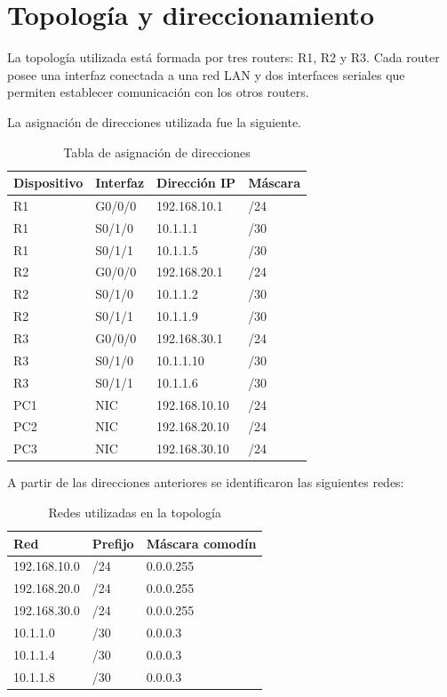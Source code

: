\documentclass[12pt,a4paper]{article}
\begin{document}
\section{Topología y direccionamiento}

La topología utilizada está formada por tres routers: R1, R2 y R3.
Cada router posee una interfaz conectada a una red LAN y dos
interfaces seriales que permiten establecer comunicación con los otros
routers.

La asignación de direcciones utilizada fue la siguiente.

\begin{table}[H]
\centering
\caption{Tabla de asignación de direcciones}
\begin{tabular}{llll}
\toprule
\textbf{Dispositivo} & \textbf{Interfaz} & \textbf{Dirección IP} &
\textbf{Máscara} \\
\midrule
R1 & G0/0/0 & 192.168.10.1 & /24 \\
R1 & S0/1/0 & 10.1.1.1 & /30 \\
R1 & S0/1/1 & 10.1.1.5 & /30 \\
R2 & G0/0/0 & 192.168.20.1 & /24 \\
R2 & S0/1/0 & 10.1.1.2 & /30 \\
R2 & S0/1/1 & 10.1.1.9 & /30 \\
R3 & G0/0/0 & 192.168.30.1 & /24 \\
R3 & S0/1/0 & 10.1.1.10 & /30 \\
R3 & S0/1/1 & 10.1.1.6 & /30 \\
PC1 & NIC & 192.168.10.10 & /24 \\
PC2 & NIC & 192.168.20.10 & /24 \\
PC3 & NIC & 192.168.30.10 & /24 \\
\bottomrule
\end{tabular}
\end{table}

A partir de las direcciones anteriores se identificaron las siguientes
redes:

\begin{table}[H]
\centering
\caption{Redes utilizadas en la topología}
\begin{tabular}{lll}
\toprule
\textbf{Red} & \textbf{Prefijo} & \textbf{Máscara comodín} \\
\midrule
192.168.10.0 & /24 & 0.0.0.255 \\
192.168.20.0 & /24 & 0.0.0.255 \\
192.168.30.0 & /24 & 0.0.0.255 \\
10.1.1.0 & /30 & 0.0.0.3 \\
10.1.1.4 & /30 & 0.0.0.3 \\
10.1.1.8 & /30 & 0.0.0.3 \\
\bottomrule
\end{tabular}
\end{table}
\end{document}

